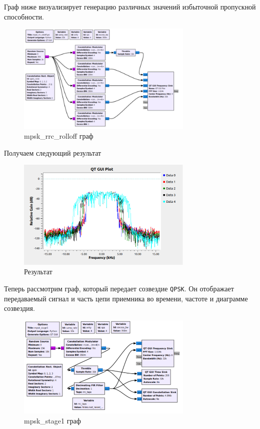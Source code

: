 \documentclass[a4paper,12pt]{article}
\begin{document}
	Граф ниже визуализирует генерацию различных значений избыточной пропускной способности.
	
	\begin{figure}[H]
		\centering
		\includegraphics[width=0.75\textwidth]{1_1.png}
		\caption{mpsk\_rrc\_rolloff граф}
		\label{fig:1.1}
	\end{figure}

	Получаем следующий результат
	
	\begin{figure}[H]
		\centering
		\includegraphics[width=0.75\textwidth]{1_2.png}
		\caption{Результат}
		\label{fig:1.2}
	\end{figure}
	
	Теперь рассмотрим граф, который передает созвездие \texttt{QPSK}. Он отображает передаваемый сигнал и часть цепи приемника во времени, частоте и диаграмме созвездия.
	
	\begin{figure}[H]
		\centering
		\includegraphics[width=0.75\textwidth]{1_3.png}
		\caption{mpsk\_stage1 граф}
		\label{fig:1.3}
	\end{figure}
	
\end{document}
